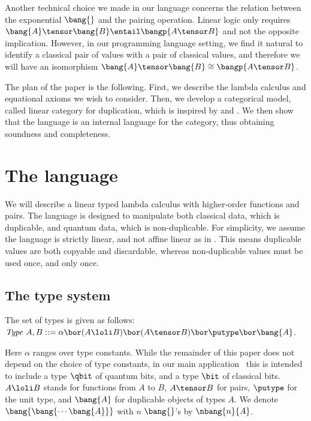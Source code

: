 \documentclass{llncs}
\begin{document}
Another technical choice we made in our language concerns the relation
between the exponential $\bang{}$ and the pairing operation. Linear
logic only requires $\bang{A}\tensor\bang{B} \entail \bangp{A\tensor
 B}$ and not the opposite implication. However, in our programming
language setting, we find it natural to identify a classical pair of
values with a pair of classical values, and therefore we will have an
isomorphism $\bang{A}\tensor\bang{B} \cong \bangp{A\tensor B}$.

The plan of the paper is the following. First, we describe the lambda
calculus and equational axioms we wish to consider. Then, we develop a
categorical model, called linear category for duplication, which is
inspired by \cite{bierman93intuitionistic} and \cite{moggi91notions}.
We then show that the language is an internal language for the
category, thus obtaining soundness and completeness. 



\section{The language}
\label{sec:language}

We will describe a linear typed lambda calculus with higher-order
functions and pairs. The language is designed to manipulate both
classical data, which is duplicable, and quantum data, which is
non-duplicable. For simplicity, we assume the language is strictly
linear, and not affine linear as in {\cite{selinger05lambda}}. This
means duplicable values are both copyable and discardable, whereas
non-duplicable values must be used once, and only once.
\vspace{-2ex}

\subsection{The type system}

The set of types is given as follows: ${\it Type}\ A,B ::=  \alpha\bor (A\loli B) 
      \bor (A\tensor B)\bor\putype \bor \bang{A}$.

Here $\alpha$ ranges over type constants. While the remainder of this
paper does not depend on the choice of type constants, 
in our main application~\cite{selinger05lambda}
this is
intended to include a type $\qbit$ of quantum bits, and a type $\bit$
of classical bits. $A\loli B$ stands for
functions from $A$ to $B$, $A\tensor B$ for pairs, $\putype$ for the
unit type, and $\bang{A}$ for duplicable objects of types $A$. We
denote $\bang{\bang{\cdots\bang{A}}}$ with $n$ $\bang{}$'s 
by $\nbang{n}{A}$.
\end{document}
